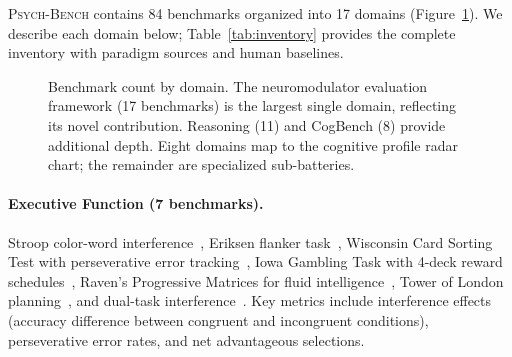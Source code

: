 \documentclass[11pt,letterpaper]{article}
\newcommand{\psychbench}{\textsc{Psych-Bench}}
\begin{document}
\psychbench{} contains 84 benchmarks organized into 17 domains (Figure~\ref{fig:domain_matrix}). We describe each domain below; Table~\ref{tab:inventory} provides the complete inventory with paradigm sources and human baselines.

\begin{figure}[t]
\centering
{}
\caption{Benchmark count by domain. The neuromodulator evaluation framework (17 benchmarks) is the largest single domain, reflecting its novel contribution. Reasoning (11) and CogBench (8) provide additional depth. Eight domains map to the cognitive profile radar chart; the remainder are specialized sub-batteries.}
\label{fig:domain_matrix}
\end{figure}

\paragraph{Executive Function (7 benchmarks).} Stroop color-word interference~\citep{stroop1935interference,macleod1991half}, Eriksen flanker task~\citep{eriksen1974effects}, Wisconsin Card Sorting Test with perseverative error tracking~\citep{berg1948simple}, Iowa Gambling Task with 4-deck reward schedules~\citep{bechara1994insensitivity}, Raven's Progressive Matrices for fluid intelligence~\citep{raven1938progressive}, Tower of London planning~\citep{shallice1982specific}, and dual-task interference~\citep{pashler1994dual}. Key metrics include interference effects (accuracy difference between congruent and incongruent conditions), perseverative error rates, and net advantageous selections.
\end{document}

